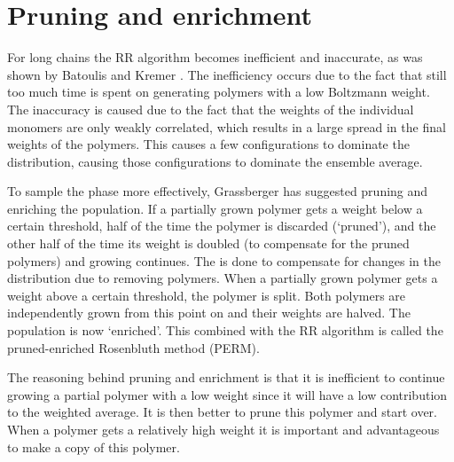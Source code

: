 \section{Pruning and enrichment}
For long chains the RR algorithm becomes inefficient and inaccurate, as was shown by Batoulis and Kremer \cite{batoulis1988statistical}. The inefficiency occurs due to the fact that still too much time is spent on generating polymers with a low Boltzmann weight. The inaccuracy is caused due to the fact that the weights of the individual monomers are only weakly correlated, which results in a large spread in the final weights of the polymers. This causes a few configurations to dominate the distribution, causing those configurations to dominate the ensemble average. 

To sample the phase more effectively, Grassberger has suggested pruning and enriching the population. If a partially grown polymer gets a weight below a certain threshold, half of the time the polymer is discarded (`pruned'), and the other half of the time its weight is doubled (to compensate for the pruned polymers) and growing continues. The is done to compensate for changes in the distribution due to removing polymers. When a partially grown polymer gets a weight above a certain threshold, the polymer is split. Both polymers are independently grown from this point on and their weights are halved. The population is now `enriched'. This combined with the RR algorithm is called the pruned-enriched Rosenbluth method (PERM). 

The reasoning behind pruning and enrichment is that it is inefficient to continue growing a partial polymer with a low weight since it will have a low contribution to the weighted average. It is then better to prune this polymer and start over. When a polymer gets a relatively high weight it is important and advantageous to make a copy of this polymer.

\begin{Figure}
    \vspace{18 mm}
    \centering
    \def\svgwidth{\linewidth}
    
    \label{fig:perm}
\end{Figure}

